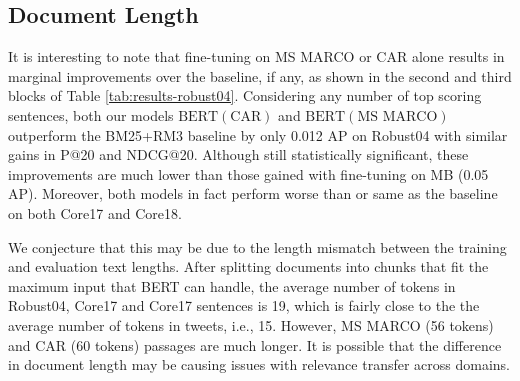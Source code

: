 \subsection{Document Length}

\begin{table}[t!]
\centering{}
\caption{Ranking effectiveness on Robust04 with the shortened MS MARCO and CAR models indicated with $\star$.}
\label{tab:results-chopped}
\end{table}

It is interesting to note that fine-tuning on MS MARCO or CAR alone results in marginal improvements over the baseline, if any, as shown in the second and third blocks of Table \ref{tab:results-robust04}.
Considering any number of top scoring sentences, both our models $ \textrm{BERT}(\textrm{CAR}) $ and $ \textrm{BERT}(\textrm{MS MARCO}) $ outperform the BM25+RM3 baseline by only 0.012 AP on Robust04 with similar gains in P@20 and NDCG@20.
Although still statistically significant, these improvements are much lower than those gained with fine-tuning on MB (0.05 AP).
Moreover, both models in fact perform worse than or same as the baseline on both Core17 and Core18.

We conjecture that this may be due to the length mismatch between the training and evaluation text lengths.
After splitting documents into chunks that fit the maximum input that BERT can handle, the average number of tokens in Robust04, Core17 and Core17 sentences is 19, which is fairly close to the the average number of tokens in tweets, i.e., 15.
However, MS MARCO (56 tokens) and CAR (60 tokens) passages are much longer.
It is possible that the difference in document length may be causing issues with relevance transfer across domains.

